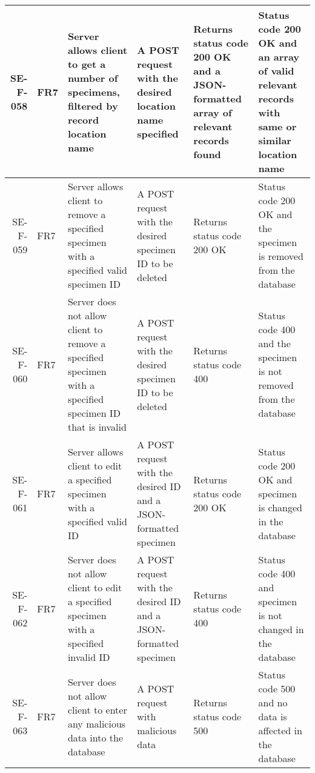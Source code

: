 \begin{landscape}
\begin{longtable}{|r|l|p{4cm}|p{4cm}|p{4cm}|p{4cm}|}
		SE-F-058 & FR7 & Server allows client to get a number of specimens, filtered by record location name & A POST request with the desired location name specified & Returns status code 200 OK and a JSON-formatted array of relevant records found & Status code 200 OK and an array of valid relevant records with same or similar location name \\ \hline
		SE-F-059 & FR7 & Server allows client to remove a specified specimen with a specified valid specimen ID &  A POST request with the desired specimen ID to be deleted &  Returns status code 200 OK &  Status code 200 OK and the specimen is removed from the database \\ \hline
		SE-F-060 & FR7 & Server does not allow client to remove a specified specimen with a specified specimen ID that is invalid&  A POST request with the desired specimen ID to be deleted &  Returns status code 400 &  Status code 400 and the specimen is not removed from the database \\ \hline
		SE-F-061 & FR7 & Server allows client to edit a specified specimen with a specified valid ID & A POST request with the desired ID and a JSON-formatted specimen & Returns status code 200 OK  & Status code 200 OK and specimen is changed in the database \\ \hline
		SE-F-062 & FR7 & Server does not allow client to edit a specified specimen with a specified invalid ID & A POST request with the desired ID and a JSON-formatted specimen & Returns status code 400  & Status code 400 and specimen is not changed in the database \\ \hline
		SE-F-063 & FR7 & Server does not allow client to enter any malicious data into the database & A POST request with malicious data & Returns status code 500 & Status code 500 and no data is affected in the database \\ \hline
		\end{longtable}
	\end{landscape}
